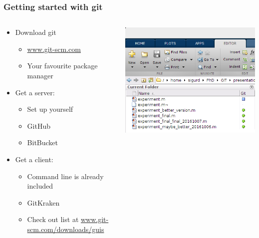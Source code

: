 \begin{frame}
	\frametitle{Getting started with git}
	\begin{columns}
		\begin{column}{0.5\textwidth}
			\begin{itemize}[<+->]
				\item Download git
					\begin{itemize}[<+->]
							\item \url{www.git-scm.com}
							\item Your favourite package manager
					\end{itemize}
				\item Get a server:
					\begin{itemize}[<+->]
						\item Set up yourself
						\item GitHub
						\item BitBucket
				\end{itemize}
				\item Get a client:
					\begin{itemize}[<+->]
						\item Command line is already included
						\item GitKraken
						\item Check out list at \url{www.git-scm.com/downloads/guis}
					\end{itemize}
				\end{itemize}
			\end{column}
			\begin{column}{0.5\textwidth}
					\includegraphics[width=\textwidth]{./pictures/matlab.png}
			\end{column}
	\end{columns}
\end{frame}
